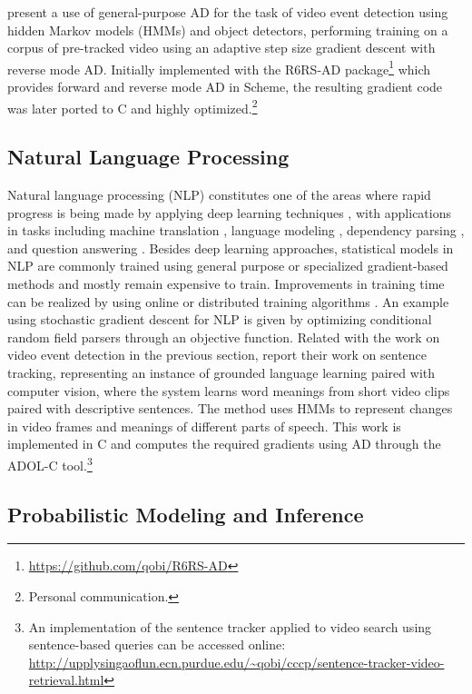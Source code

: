 \documentclass[twoside,11pt]{article}
\begin{document}
\citet{Barrett2013} present a use of general-purpose AD for the task of video event detection using hidden Markov models (HMMs) and \citet{Dalal2005} object detectors, performing training on a corpus of pre-tracked video using an adaptive step size gradient descent with reverse mode AD. Initially implemented with the R6RS-AD package\footnote{\url{https://github.com/qobi/R6RS-AD}} which provides forward and reverse mode AD in Scheme, the resulting gradient code was later ported to C and highly optimized.\footnote{Personal communication.}


\subsection{Natural Language Processing}

Natural language processing (NLP) constitutes one of the areas where rapid progress is being made by applying deep learning techniques \citep{goldberg2016primer}, with applications in tasks including machine translation \citep{bahdanau2014neural}, language modeling \citep{mikolov2010recurrent}, dependency parsing \citep{chen2014fast}, and question answering \citep{pmlr-v48-kumar16}. Besides deep learning approaches, statistical models in NLP are commonly trained using general purpose or specialized gradient-based methods and mostly remain expensive to train. Improvements in training time can be realized by using online or distributed training algorithms \citep{Gimpel2010}. An example using stochastic gradient descent for NLP is given by \citet{Finkel2008} optimizing conditional random field parsers through an objective function. Related with the work on video event detection in the previous section, \citet{Yu2013} report their work on sentence tracking, representing an instance of grounded language learning paired with computer vision, where the system learns word meanings from short video clips paired with descriptive sentences. The method uses HMMs to represent changes in video frames and meanings of different parts of speech. This work is implemented in C and computes the required gradients using AD through the ADOL-C tool.\footnote{An implementation of the sentence tracker applied to video search using sentence-based queries can be accessed online: \url{http://upplysingaoflun.ecn.purdue.edu/~qobi/cccp/sentence-tracker-video-retrieval.html}}

\subsection{Probabilistic Modeling and Inference}
\end{document}
